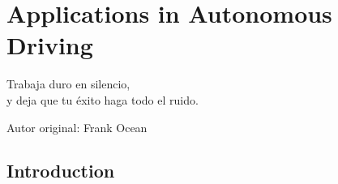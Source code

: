 % 
% 
% 
% 
% 
% 
% 

\chapter{Applications in Autonomous Driving}
\label{cha:applications_in_autonomous_driving}

\begin{FraseCelebre}
	\begin{Frase}
		Trabaja duro en silencio, \\
		y deja que tu éxito haga todo el ruido.
	\end{Frase}
	\begin{Fuente}
		Autor original: Frank Ocean
	\end{Fuente}
\end{FraseCelebre}

\section{Introduction}
\label{sec:8_introduction}


